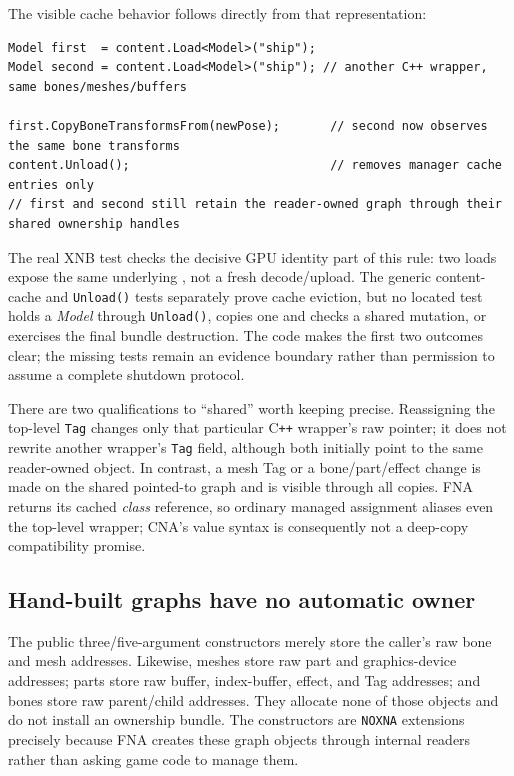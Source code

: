 The visible cache behavior follows directly from that representation:

\begin{lstlisting}
Model first  = content.Load<Model>("ship");
Model second = content.Load<Model>("ship"); // another C++ wrapper, same bones/meshes/buffers

first.CopyBoneTransformsFrom(newPose);       // second now observes the same bone transforms
content.Unload();                            // removes manager cache entries only
// first and second still retain the reader-owned graph through their shared ownership handles
\end{lstlisting}

The real XNB test checks the decisive GPU identity part of this rule: two loads expose the same
underlying , not a fresh decode/upload. The generic content-cache and
\texttt{Unload()} tests separately prove cache eviction, but no located test holds a \emph{Model}
through \texttt{Unload()}, copies one and checks a shared mutation, or exercises the final
bundle destruction. The code makes the first two outcomes clear; the missing tests remain an
evidence boundary rather than permission to assume a complete shutdown protocol.

There are two qualifications to ``shared'' worth keeping precise. Reassigning the top-level
\texttt{Tag} changes only that particular C\texttt{++} wrapper's raw pointer; it does not rewrite
another wrapper's \texttt{Tag} field, although both initially point to the same reader-owned
object. In contrast, a mesh Tag or a bone/part/effect change is made on the shared pointed-to
graph and is visible through all copies. FNA returns its cached  \emph{class}
reference, so ordinary managed assignment aliases even the top-level wrapper; CNA's value syntax
is consequently not a deep-copy compatibility promise.

\subsection{Hand-built graphs have no automatic owner}

The public three/five-argument  constructors merely store the caller's raw
bone and mesh addresses. Likewise, meshes store raw part and graphics-device addresses; parts
store raw buffer, index-buffer, effect, and Tag addresses; and bones store raw parent/child
addresses. They allocate none of those objects and do not install an ownership bundle. The
constructors are \texttt{NOXNA} extensions precisely because FNA creates these graph objects
through internal readers rather than asking game code to manage them.

